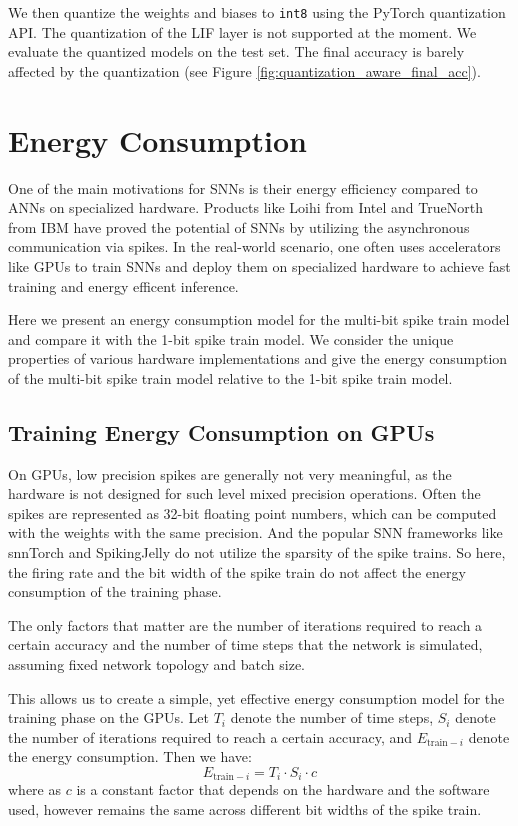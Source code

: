     We then quantize the weights and biases to \verb|int8| using the PyTorch quantization API. The quantization of the LIF layer is not supported at the moment. We evaluate the quantized models on the test set. The final accuracy is barely affected by the quantization (see Figure \ref{fig:quantization_aware_final_acc}). 

\section{Energy Consumption}
\label{sec:energy-consumption}
    One of the main motivations for SNNs is their energy efficiency compared to ANNs on specialized hardware. Products like Loihi from Intel \cite{8259423} and TrueNorth from IBM \cite{7229264} have proved the potential of SNNs by utilizing the asynchronous communication via spikes. In the real-world scenario, one often uses accelerators like GPUs to train SNNs and deploy them on specialized hardware to achieve fast training and energy efficent inference. 

    Here we present an energy consumption model for the multi-bit spike train model and compare it with the 1-bit spike train model. We consider the unique properties of various hardware implementations and give the energy consumption of the multi-bit spike train model relative to the 1-bit spike train model. 

    \subsection{Training Energy Consumption on GPUs}
    \label{subsec:training_energy}
        On GPUs, low precision spikes are generally not very meaningful, as the hardware is not designed for such level mixed precision operations. Often the spikes are represented as 32-bit floating point numbers, which can be computed with the weights with the same precision. And the popular SNN frameworks like snnTorch and SpikingJelly do not utilize the sparsity of the spike trains. So here, the firing rate and the bit width of the spike train do not affect the energy consumption of the training phase. 
    
        The only factors that matter are the number of iterations required to reach a certain accuracy and the number of time steps that the network is simulated, assuming fixed network topology and batch size. 
    
        This allows us to create a simple, yet effective energy consumption model for the training phase on the GPUs. Let $T_i$ denote the number of time steps, $S_i$ denote the number of iterations required to reach a certain accuracy, and $E_{\text{train}-i}$ denote the energy consumption. Then we have:
        \begin{equation}
            E_{\text{train}-i} = T_i \cdot S_i \cdot c
        \end{equation}
        where as $c$ is a constant factor that depends on the hardware and the software used, however remains the same across different bit widths of the spike train. 
    
